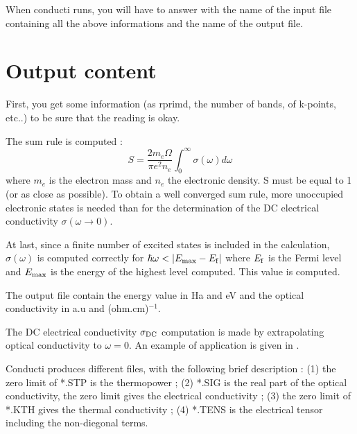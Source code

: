 \documentclass[a4,12pts]{article}
\begin{document}
When conducti runs, you will have to answer with the name of the input file containing all the
above informations and the name of the output file.

\section{Output content}
First, you get some information (as rprimd, the number of bands, of k-points, etc..) to be
sure that the reading is okay.

The sum rule is computed \cite{KUBO57}:
%
\begin{equation}
 S= \frac{2 m_e \Omega}{\pi e^2 n_e} \int_0^\infty \sigma(\omega) d\omega
\end{equation}
%
where $m_e$ is the electron mass and $n_e$ the electronic density. S must be equal to 1 (or
as close as possible).
To obtain a well converged sum rule, more unoccupied electronic
states is needed than for the
determination of the DC electrical conductivity $\sigma(\omega \rightarrow 0)$.

At last, since a finite number of excited states is included in the calculation,
$\sigma(\omega)$ is computed correctly for $\hbar\omega<|E_{\rm max}-E_{\rm f}|$ where
$E_{\rm f}$ is the Fermi level and $E_{\rm max}$ is the energy of the highest level computed.
This value is computed.


The output file contain the energy value in Ha and eV and the optical conductivity in
a.u and (ohm.cm)$^{-1}$.

The DC electrical conductivity $\sigma_{{\rm DC}}$ computation is made by
extrapolating optical conductivity to $\omega=0$. An example
of application is given in \cite{RECO02}.

Conducti produces different files, with the following brief description :
(1) the zero limit of *.STP is the thermopower ; (2) *.SIG is the real part of the
optical conductivity, the zero limit gives the electrical conductivity ;
(3) the zero limit of *.KTH gives the thermal conductivity ;
(4) *.TENS is the electrical tensor including the non-diegonal terms.
\end{document}
